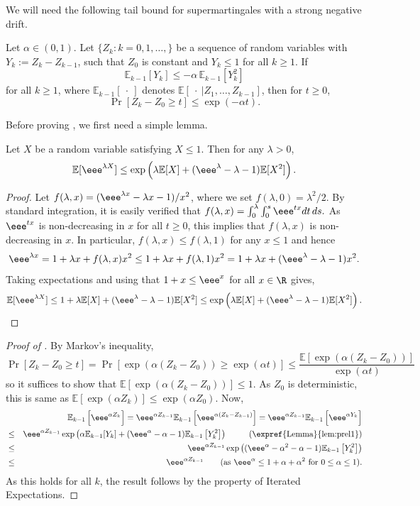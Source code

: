 \documentclass{toc}
\newcommand{\E}{\mathbb{E}}
\begin{document}
We will need the following tail bound for supermartingales with a strong negative drift.
\begin{theorem}
\label{lem:prel2}
Let $\alpha \in (0,1)$.
Let $\{Z_k: k=0,1,\ldots,\}$ be a sequence of random variables with $Y_k:=Z_k - Z_{k-1}$, such that $Z_0$ is constant %
and $Y_k\leq 1$ for all $k \geq 1$. If 
\[\E_{k-1}[Y_k] \le  -\alpha\, \E_{k-1}[Y_k^2]\]
for all $k\geq 1$, where $\E_{k-1}[\ \cdot \ ]$ denotes $ \E[\ \cdot \ | Z_1,\dots, Z_{k-1}]$, 
then for $t \geq 0$,
\[ \Pr[Z_k  - Z_0 \geq t] \leq \exp(-\alpha t).\]
\end{theorem}
Before proving , we first need a simple lemma.
\begin{lemma}
\label{lem:prel1}
Let $X$ be a random variable satisfying $X\le 1$. Then for any $\lambda >0$,
\[\E[\eee^{\lambda X}] \le \exp\left(\lambda \E[X] +  (\eee^{\lambda} -\lambda-1 )\E[X^2]\right).\]\end{lemma}
\begin{proof}
%
%
%
%
%
%
Let $f(\lambda,x) = (\eee^{\lambda x} - \lambda x - 1)/x^2$, where we set $f(\lambda,0)=\lambda^2/2$. By standard integration, it is easily verified that 
$f(\lambda,x)  = \int_0^\lambda \int_0^s \eee^{tx} dt\, ds.$
As $\eee^{tx}$ is non-decreasing in $x$ for all $t\geq 0$, this implies that $f(\lambda,x)$ is  non-decreasing in $x$.
In particular, $f(\lambda,x) \leq f(\lambda,1)$ for any $x \leq 1$ and hence 
\[\eee^{\lambda x} = 1 + \lambda x +  f(\lambda,x) x^2  \leq 1 + \lambda x  + f(\lambda,1)x^2 = 1 + \lambda x +   (\eee^{\lambda} -\lambda-1 )x^2.\]
Taking expectations and using that $1+x \leq \eee^x$ for all $x \in \R$ gives,
\[ \E[\eee^{\lambda X}]  \leq  1+\lambda\E[ X]+(\eee^{\lambda} -\lambda-1 )\E [X^2]   \leq \exp \left(\lambda \E[X] +(\eee^{ \lambda} -\lambda-1 )\E [X^2]\right). \qedhere\]
\end{proof}
%
%
\begin{proof}[Proof of ]  %
By Markov's inequality,
\[ \Pr[Z_k - Z_0 \geq t ]  = \Pr[\exp(\alpha (Z_k-Z_0)) \geq \exp(\alpha t)] \leq \frac{\E[\exp(\alpha (Z_k-Z_0))] }{\exp(\alpha t)}\]
so it suffices to show that $\E[ \exp(\alpha (Z_k-Z_0)) ]  \leq 1$. As $Z_0$ is deterministic,  this is same as $ \E[\exp(\alpha Z_k)] \leq  \exp(\alpha Z_0)$. Now,
%
%
%
%
%
\begin{eqnarray*}
&&\E_{k-1}\left[\eee^{\alpha Z_k}\right] =  \eee^{\alpha Z_{k-1}}\E_{k-1}\left[\eee^{\alpha(Z_k-Z_{k-1})}\right]  =  \eee^{\alpha Z_{k-1}}\E_{k-1}\left[\eee^{\alpha Y_k}\right] \\
& \le &  \eee^{\alpha Z_{k-1}} \exp\left( \alpha \E_{k-1}[Y_k] +(\eee^{ \alpha} -\alpha-1 )\E_{k-1}\left[Y_k^2\right]\right)  \,\,\,\,  \qquad \textrm{(\expref{Lemma}{lem:prel1})}\\
 & \le & \eee^{\alpha Z_{k-1}}\exp\left((\eee^{ \alpha} -\alpha^2 - \alpha-1 )\E_{k-1}\left[Y_k^2\right]\right) \\
 & \leq & \eee^{\alpha Z_{k-1}}   \qquad \textrm{(as $\eee^\alpha \leq 1 + \alpha + \alpha^2$ for $0 \leq \alpha \leq 1$)}.
\end{eqnarray*}
As this holds for all $k$, the result follows by the property of Iterated Expectations.
\end{proof}
\end{document}

